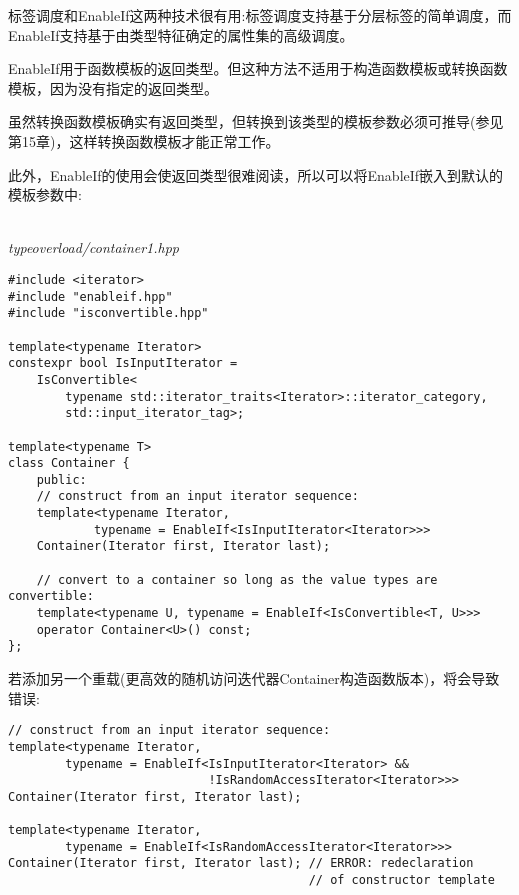 标签调度和EnableIf这两种技术很有用:标签调度支持基于分层标签的简单调度，而EnableIf支持基于由类型特征确定的属性集的高级调度。


EnableIf用于函数模板的返回类型。但这种方法不适用于构造函数模板或转换函数模板，因为没有指定的返回类型。

\begin{tcolorbox}[colback=webgreen!5!white,colframe=webgreen!75!black]
\hspace*{0.75cm}虽然转换函数模板确实有返回类型，但转换到该类型的模板参数必须可推导(参见第15章)，这样转换函数模板才能正常工作。
\end{tcolorbox}

此外，EnableIf的使用会使返回类型很难阅读，所以可以将EnableIf嵌入到默认的模板参数中:

\hspace*{\fill} \\ %
\noindent
\textit{typeoverload/container1.hpp}
\begin{lstlisting}[style=styleCXX]
#include <iterator>
#include "enableif.hpp"
#include "isconvertible.hpp"

template<typename Iterator>
constexpr bool IsInputIterator =
	IsConvertible<
		typename std::iterator_traits<Iterator>::iterator_category,
		std::input_iterator_tag>;

template<typename T>
class Container {
	public:
	// construct from an input iterator sequence:
	template<typename Iterator,
			typename = EnableIf<IsInputIterator<Iterator>>>
	Container(Iterator first, Iterator last);
	
	// convert to a container so long as the value types are convertible:
	template<typename U, typename = EnableIf<IsConvertible<T, U>>>
	operator Container<U>() const;
};
\end{lstlisting}

若添加另一个重载(更高效的随机访问迭代器Container构造函数版本)，将会导致错误:

\begin{lstlisting}[style=styleCXX]
// construct from an input iterator sequence:
template<typename Iterator,
		typename = EnableIf<IsInputIterator<Iterator> &&
							!IsRandomAccessIterator<Iterator>>>
Container(Iterator first, Iterator last);

template<typename Iterator,
		typename = EnableIf<IsRandomAccessIterator<Iterator>>>
Container(Iterator first, Iterator last); // ERROR: redeclaration
										  // of constructor template
\end{lstlisting}

